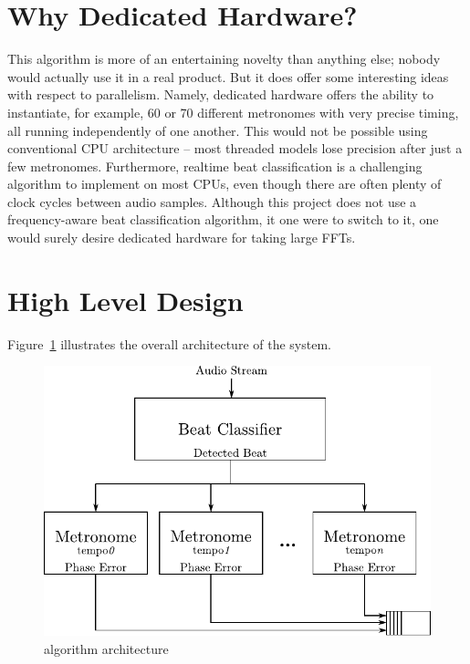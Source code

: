 \documentclass[letterpaper]{article}
\begin{document}
\section{Why Dedicated Hardware?}

    This algorithm is more of an entertaining novelty than anything else;
    nobody would actually use it in a real product.  But it does offer some
    interesting ideas with respect to parallelism.  Namely, dedicated hardware
    offers the ability to instantiate, for example, 60 or 70 different
    metronomes with very precise timing, all running independently of one
    another.  This would not be possible using conventional CPU architecture --
    most threaded models lose precision after just a few metronomes.
    Furthermore, realtime beat classification is a challenging algorithm to
    implement on most CPUs, even though there are often plenty of clock cycles
    between audio samples.  Although this project does not use a
    frequency-aware beat classification algorithm, it one were to switch to it,
    one would surely desire dedicated hardware for taking large FFTs.


\section{High Level Design}
    
    Figure~\ref{fig:architecture} illustrates the overall
    architecture of the system.

    \begin{figure}
        \centering
        \includegraphics{fig/architecture.pdf}
        \caption{\projname algorithm architecture}
        \label{fig:architecture}
    \end{figure}
\end{document}
